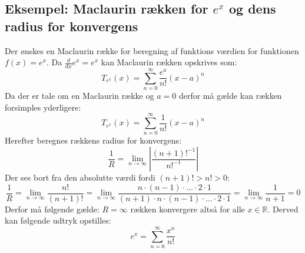
\subsection*{\textbf{Eksempel:} Maclaurin rækken for $e^x$ og dens radius for konvergens} 
Der ønskes en Maclaurin række for beregning af funktions værdien for funktionen $f(x) = e^x$.
Da $\frac{d}{dx}e^x = e^x$ kan Maclaurin rækken opskrives som:
\[
    T_{e^x}(x) = \sum^\infty_{n = 0} \frac{e^a}{n!}(x-a)^n
\]
Da der er tale om en Maclaurin række og $a = 0$ derfor må gælde kan rækken forsimples yderligere:
\[
    T_{e^x}(x) = \sum^\infty_{n = 0} \frac{1}{n!}(x-a)^n
\]
Herefter beregnes rækkens radius for konvergens:
\[
    \frac{1}{R} = \lim_{n \rightarrow \infty} \left\lvert \frac{(n + 1)!^{-1}}{n!^{-1}} \right\lvert
\]
Der ses bort fra den absolutte værdi fordi $(n + 1)! > n! > 0$:
\[
    \frac{1}{R}= \lim_{n \rightarrow \infty} \frac{n!}{(n + 1)!} 
    = \lim_{n \rightarrow \infty} \frac{n \cdot (n-1) \cdot \ldots \cdot 2 \cdot 1}{(n + 1) \cdot n \cdot (n-1) \cdot \ldots \cdot 2 \cdot 1}
    = \lim_{n \rightarrow \infty} \frac{1}{n + 1} = 0
\]
Derfor må følgende gælde: $R = \infty$ rækken konvergere altså for alle $x \in \mathbb{R}$.
Derved kan følgende udtryk opstilles:
\[
    e^x = \sum^\infty_{n = 0} \frac{x^n}{n!}  
\]
